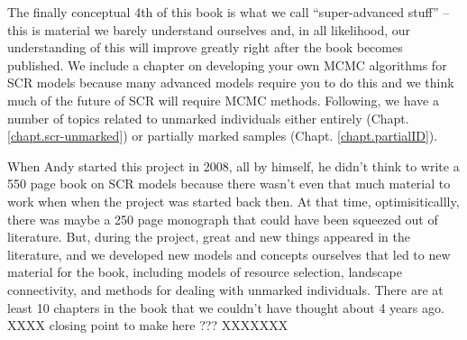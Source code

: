 The finally conceptual 4th of this book is what we call
``super-advanced stuff'' -- this is material we barely understand
ourselves and, in all likelihood, our understanding of this will
improve greatly right after the book becomes published. 
 We include a chapter on developing your
own MCMC algorithms for SCR models because many advanced
models require you to do this and we think much of the future of SCR
will require MCMC methods. Following, we have a 
 number of topics related to unmarked individuals
either entirely (Chapt. \ref{chapt.scr-unmarked}) or partially marked
samples (Chapt. \ref{chapt.partialID}).

When Andy started this project in 2008, all by himself, he didn't 
think to write a 550 page book on SCR models because there
wasn't even that much material to work when when the project was
started back then. At that time, optimisiticallly, there was 
maybe a 250 page monograph that could have been squeezed out of
literature. 
But, during the project, great and new things
appeared in the literature, and we developed new models and concepts
ourselves that led to
new material for the book, including models of resource selection,
landscape connectivity, and methods for dealing with unmarked
individuals. There are at least 10 chapters in the book that we
couldn't have thought about 4 years ago. 
XXXX closing point to make here ??? XXXXXXX


